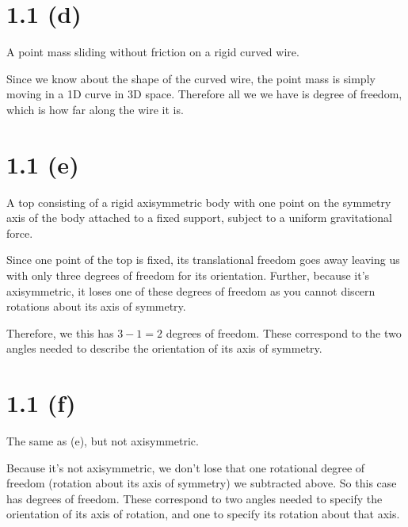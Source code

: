 \documentclass{article}
\begin{document}
\section*{1.1 (d)}

A point mass sliding without friction on a rigid curved wire.

Since we know about the shape of the curved wire, the point mass is
simply moving in a 1D curve in 3D space. Therefore all we we have is
 degree of freedom, which is how far along the wire it is.

\section*{1.1 (e)}

A top consisting of a rigid axisymmetric body with one point on the
symmetry axis of the body attached to a fixed support, subject to a
uniform gravitational force.

Since one point of the top is fixed, its translational freedom goes
away leaving us with only three degrees of freedom for its
orientation. Further, because it's axisymmetric, it loses one of these
degrees of freedom as you cannot discern rotations about its axis of
symmetry.

Therefore, we this has $3 - 1 = \boxed{2}$ degrees of freedom. These
correspond to the two angles needed to describe the orientation of its
axis of symmetry.

\section*{1.1 (f)}

The same as (e), but not axisymmetric.

Because it's not axisymmetric, we don't lose that one rotational
degree of freedom (rotation about its axis of symmetry) we subtracted
above. So this case has  degrees of freedom. These correspond
to two angles needed to specify the orientation of its axis of
rotation, and one to specify its rotation about that axis.
\end{document}
